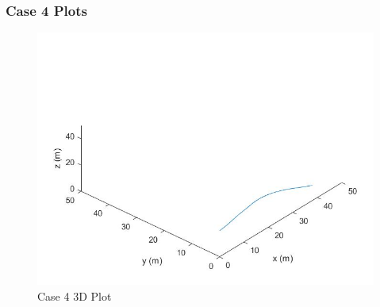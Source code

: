 \documentclass[12pt,twoside,letterpaper]{article}
\begin{document}
\subsubsection{Case 4 Plots}
\begin{figure}[H]
\centering
\includegraphics[width=15cm]{figures/case_4_3D.jpg}
\caption{Case 4 3D Plot}
\label{Case 4 3D Plot}
\end{figure}
\end{document}

